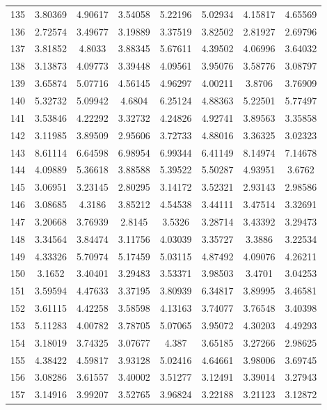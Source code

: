 \begin{center}
\begin{longtable}{cccccccc}
135 & 3.80369 & 4.90617 & 3.54058 & 5.22196 & 5.02934 & 4.15817 & 4.65569\\
136 & 2.72574 & 3.49677 & 3.19889 & 3.37519 & 3.82502 & 2.81927 & 2.69796\\
137 & 3.81852 & 4.8033 & 3.88345 & 5.67611 & 4.39502 & 4.06996 & 3.64032\\
138 & 3.13873 & 4.09773 & 3.39448 & 4.09561 & 3.95076 & 3.58776 & 3.08797\\
139 & 3.65874 & 5.07716 & 4.56145 & 4.96297 & 4.00211 & 3.8706 & 3.76909\\
140 & 5.32732 & 5.09942 & 4.6804 & 6.25124 & 4.88363 & 5.22501 & 5.77497\\
141 & 3.53846 & 4.22292 & 3.32732 & 4.24826 & 4.92741 & 3.89563 & 3.35858\\
142 & 3.11985 & 3.89509 & 2.95606 & 3.72733 & 4.88016 & 3.36325 & 3.02323\\
143 & 8.61114 & 6.64598 & 6.98954 & 6.99344 & 6.41149 & 8.14974 & 7.14678\\
144 & 4.09889 & 5.36618 & 3.88588 & 5.39522 & 5.50287 & 4.93951 & 3.6762\\
145 & 3.06951 & 3.23145 & 2.80295 & 3.14172 & 3.52321 & 2.93143 & 2.98586\\
146 & 3.08685 & 4.3186 & 3.85212 & 4.54538 & 3.44111 & 3.47514 & 3.32691\\
147 & 3.20668 & 3.76939 & 2.8145 & 3.5326 & 3.28714 & 3.43392 & 3.29473\\
148 & 3.34564 & 3.84474 & 3.11756 & 4.03039 & 3.35727 & 3.3886 & 3.22534\\
149 & 4.33326 & 5.70974 & 5.17459 & 5.03115 & 4.87492 & 4.09076 & 4.26211\\
150 & 3.1652 & 3.40401 & 3.29483 & 3.53371 & 3.98503 & 3.4701 & 3.04253\\
151 & 3.59594 & 4.47633 & 3.37195 & 3.80939 & 6.34817 & 3.89995 & 3.46581\\
152 & 3.61115 & 4.42258 & 3.58598 & 4.13163 & 3.74077 & 3.76548 & 3.40398\\
153 & 5.11283 & 4.00782 & 3.78705 & 5.07065 & 3.95072 & 4.30203 & 4.49293\\
154 & 3.18019 & 3.74325 & 3.07677 & 4.387 & 3.65185 & 3.27266 & 2.98625\\
155 & 4.38422 & 4.59817 & 3.93128 & 5.02416 & 4.64661 & 3.98006 & 3.69745\\
156 & 3.08286 & 3.61557 & 3.40002 & 3.51277 & 3.12491 & 3.39014 & 3.27943\\
157 & 3.14916 & 3.99207 & 3.52765 & 3.96824 & 3.22188 & 3.21123 & 3.12872\\

\end{longtable}
\end{center}
